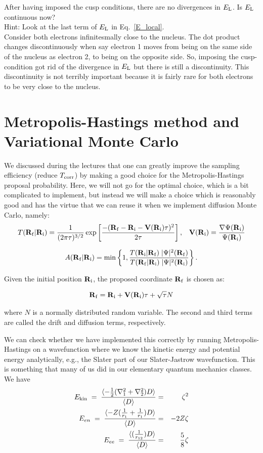 \documentclass[11pt,aps,prb,amsmath,amssymb,superscriptaddress,notitlepage]{revtex4-1}
\def\beq{\begin{eqnarray}}
\def\eeq{\end{eqnarray}}
\def\EL{E_{\rm L}}
\def\Tcorr{T_{\rm corr}}
\begin{document}
{After having imposed the cusp conditions, there are no divergences in $\EL$.
Is $\EL$ continuous now? \\
Hint: Look at the last term of $\EL$ in Eq.~\ref{E_local}.\\
{\color{darkgreen} Consider both electrons infinitesmally close to the nucleus.  The dot product changes
discontinuously when say electron 1 moves from being on the same side of the nucleus as electron 2, to being
on the opposite side.  So, imposing the cusp-condition got rid of the divergence in $\EL$ but there is
still a discontinuity.  This discontinuity is not terribly important because it is fairly rare for both electrons
to be very close to the nucleus.}
}

\section{Metropolis-Hastings method and Variational Monte Carlo}

We discussed during the lectures that one can greatly improve the sampling efficiency (reduce $\Tcorr$) by
making a good choice for the Metropolis-Hastings proposal probability.  Here, we will not go for the
optimal choice, which is a bit complicated to implement, but instead we will make a choice which is reasonably
good and has the virtue that we can reuse it when we implement diffusion Monte Carlo, namely:
\beq
\Pfi = {1 \over (2 \pi \tau)^{3/2}} \exp\left[{-(\f - \i - \V(\Ri) \tau)^2 \over 2 \tau}\right], \;\;\; \V(\Ri) = {\nabla \PsiRi \over \PsiRi}
\label{DMC_proposal}
\eeq

\beq
\Afi = {\rm min}\left\{1,{\Pif\; \Psisq(\Rf) \over \Pfi\; \Psisq(\Ri)}\right\}.
\label{acceptance}
\eeq

Given the initial position ${{\bf R}\!\,_{\rm i}}$, the proposed coordinate ${{\bf R}\!\,_{\rm f}}$ is chosen as:

\beq
\f = \i + \V(\i)\tau + \sqrt{\tau} N
\label{proposed_coord}
\eeq

where $N$ is a normally distributed random variable. The second and third terms are called the drift and diffusion terms, respectively.

We can check whether we have implemented this correctly by running Metropolis-Hastings on a wavefunction
where we know the kinetic energy and potential energy analytically, e.g., the Slater part of our Slater-Jastrow
wavefunction.  This is something that many of us did in our elementary quantum mechanics classes.
We have
\beq
\label{E_kin}
E_{\rm kin} \;=\; {\langle -{1 \over 2} (\nabla_1^2 + \nabla_2^2) D \rangle \over \langle D \rangle} &=& \zeta^2 \\
\label{E_en}
E_{en}  \;=\; {\langle -Z ({1 \over r_1} +{1 \over r_1}) D \rangle \over \langle D \rangle} &=& -2 Z \zeta  \\
\label{E_ee}
E_{ee}  \;=\; {\langle ({1 \over r_{12}} ) D \rangle \over \langle D \rangle} &=& {5 \over 8} \zeta
\eeq
\end{document}
